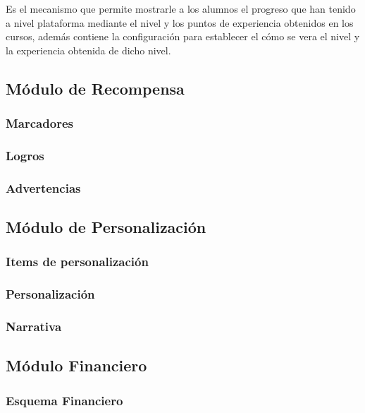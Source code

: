  Es el mecanismo que permite mostrarle a los alumnos el progreso que han tenido
 a nivel plataforma mediante el nivel y los puntos de experiencia obtenidos en 
 los cursos, además contiene la configuración para establecer el cómo se vera el
 nivel y la experiencia obtenida de dicho nivel.


\subsection{Módulo de Recompensa}

\subsubsection{Marcadores}
\subsubsection{Logros}
\subsubsection{Advertencias}

\subsection{Módulo de Personalización}

\subsubsection{Items de personalización}
\subsubsection{Personalización}
\subsubsection{Narrativa}

\subsection{Módulo Financiero}

\subsubsection{Esquema Financiero}
